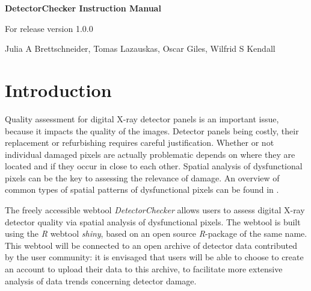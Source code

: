 \documentclass[11pt,a4paper,twosided]{article}
\newcommand{\DetectorChecker}{\emph{DetectorChecker}\xspace}
\newcommand{\Rsoftware}{\emph{R}\xspace}
\begin{document}


\begin{center}

{\Large\bf DetectorChecker Instruction Manual}

\bigskip
{\Large For release version 1.0.0}

\bigskip
{\large Julia A Brettschneider, Tomas Lazauskas, Oscar Giles, Wilfrid S Kendall}



\medskip
\end{center}




\section{Introduction}\label{int}

Quality assessment for digital X-ray detector panels is an important issue, because
it impacts the quality of the images. 
Detector panels being costly, 
their replacement or refurbishing requires careful justification.
Whether or not individual damaged pixels are actually 
problematic depends on where they are located and if they occur in close to each other.
Spatial analysis of dysfunctional pixels can be the key to assessing the relevance of damage.
An overview of 
common
types of spatial patterns of dysfunctional pixels can be found in  
\cite{brettschneider2014crism}. 

The freely accessible webtool \DetectorChecker allows users to assess digital X-ray 
detector quality via spatial analysis of dysfunctional pixels.
The webtool is built using the \Rsoftware webtool \emph{shiny}, based on an open source \Rsoftware-package of the same name.
This webtool will be
connected to an open archive of detector data contributed by the user community:
it is envisaged that users will be able to choose to create an account to upload their data to this archive,
to facilitate more extensive analysis of data trends concerning detector damage.
\end{document}

